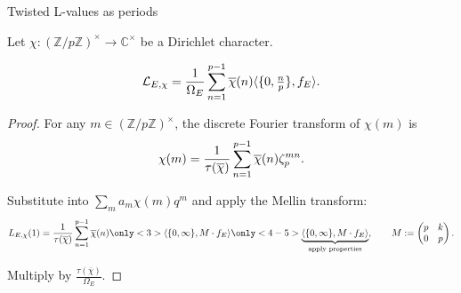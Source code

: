 \documentclass[10pt]{beamer}
\begin{document}
\begin{frame}[t]{Twisted L-values as periods}

Let $ \chi : (\mathbb{Z} / p\mathbb{Z})^\times \to \mathbb{C}^\times $ be a Dirichlet character.

\begin{lemma}[Manin]
\vspace{-0.6cm} $$ \vspace{-0.6cm} \mathcal{L}_{E, \chi} = \dfrac{1}{\Omega_E}\sum_{n = 1}^{p - 1} \overline{\chi}(n)\langle\{0, \tfrac{n}{p}\}, f_E\rangle. $$
\end{lemma}

\pause

\begin{proof}
For any $ m \in (\mathbb{Z} / p\mathbb{Z})^\times $, the discrete Fourier transform of $ \chi(m) $ is
\vspace{-0.2cm} $$ \vspace{-0.2cm} \chi(m) = \dfrac{1}{\tau(\overline{\chi})}\sum_{n = 1}^{p - 1} \overline{\chi}(n)\zeta_p^{mn}. $$

\pause

Substitute into $ \sum_m a_m\chi(m)q^m $ and apply the Mellin transform:
\vspace{-0.2cm} $$ \vspace{-0.2cm} L_{E, \chi}(1) = \dfrac{1}{\tau(\overline{\chi})}\sum_{n = 1}^{p - 1} \overline{\chi}(n)\only<3>{\langle\{0, \infty\}, M \cdot f_E\rangle}\only<4-5>{\underbrace{\langle\{0, \infty\}, M \cdot f_E\rangle}_{\text{apply properties}}}, \qquad M := \begin{pmatrix} p & k \\ 0 & p \end{pmatrix}. $$

\pause\pause

Multiply by $ \tfrac{\tau(\overline{\chi})}{\Omega_E} $.
\end{proof}

\end{frame}
\end{document}
